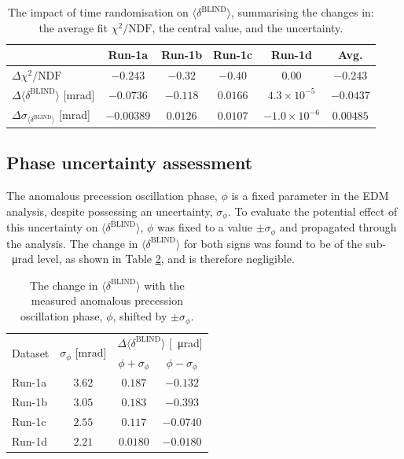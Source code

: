 \begin{table}[t!]
\centering{}
\begin{tabular}{l|ccccc}
\hline
\hline
 & Run-1a & Run-1b & Run-1c & Run-1d & Avg. \\ 
 \hline
$\Delta \chi^{2}/\text{NDF}$ & $-0.243$ & $-0.32$ & $-0.40$ & $0.00$ & $-0.243$ \\
$\Delta \langle \delta^{\text{BLIND}} \rangle$ [mrad] & $-0.0736$ & $-0.118$ & $0.0166$ & $4.3\times10^{-5}$ & $-0.0437$ \\
$\Delta \sigma_{\langle \delta^{\text{BLIND}} \rangle}$ [mrad] & $-0.00389$ & $0.0126$ & $0.0107$ & $-1.0\times10^{-6}$ & $0.00485$ \\
\hline
\hline
\end{tabular}
\caption{The impact of time randomisation on $\langle \delta^{\text{BLIND}} \rangle$, summarising the changes in: the average fit $\chi^{2}/\text{NDF}$, the central value, and the uncertainty.} 
\label{tbl:RandDeltaDiff}
\end{table}

\subsection{Phase uncertainty assessment}\label{sec:PhaseUnc}

The anomalous precession oscillation phase, $\phi$ is a fixed parameter in the EDM analysis, despite possessing an uncertainty, $\sigma_{\phi}$. To evaluate the potential effect of this uncertainty on $\langle \delta^{\text{BLIND}} \rangle$, $\phi$ was fixed to a value $\pm \sigma_{\phi}$ and propagated through the analysis. The change in $\langle \delta^{\text{BLIND}} \rangle$ for both signs was found to be of the sub-\SI{}{\micro\radian} level, as shown in Table \ref{tbl:Run1PhaseUncertainty}, and is therefore negligible.

\clearpage 

\begin{table}[h!]
\centering{}
\begin{tabular}{l|ccc}
\hline
\hline
\multirow{2}{*}{Dataset} & \multirow{2}{*}{$\sigma_{\phi}$ [mrad]} & \multicolumn{2}{c}{$\Delta \langle \delta^{\text{BLIND}} \rangle$ [\SI{}{\micro\radian}]} \\ 
& & $\phi+\sigma_{\phi}$ &  $\phi-\sigma_{\phi}$ \\
\hline
Run-1a & $3.62$ & $0.187$ & $-0.132$ \\ 
Run-1b & $3.05$ & $0.183$ & $-0.393$ \\ 
Run-1c & $2.55$ & $0.117$ & $-0.0740$ \\ 
Run-1d & $2.21$ & $0.0180$ & $-0.0180$ \\ 
\hline
\hline
\end{tabular}
\caption{The change in $\langle \delta^{\text{BLIND}} \rangle$ with the measured anomalous precession oscillation phase, $\phi$, shifted by $\pm\sigma_{\phi}$.} 
\label{tbl:Run1PhaseUncertainty}
\end{table}

